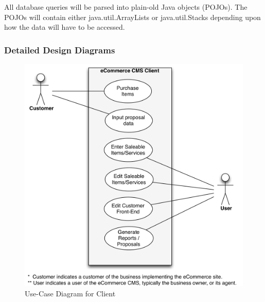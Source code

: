 \documentclass{article}
\begin{document}
All database queries will be parsed into plain-old Java objects (POJOs).  The
POJOs will contain either java.util.ArrayLists or java.util.Stacks depending
upon how the data will have to be accessed.


\subsubsection{Detailed Design Diagrams}
\label{ddd}

\begin{figure}[H]
\centering
\includegraphics[width=4.5in]{../../UML/eccms-Use Case (Client) Diagram.png}
\caption{Use-Case Diagram for Client}
\label{client-usecase}
\end{figure}
\end{document}
